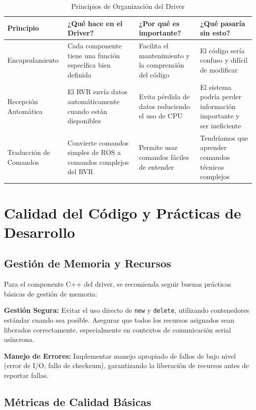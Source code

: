 \documentclass[11pt]{article}
\numberwithin{figure}{section}
\numberwithin{table}{section}
\begin{document}
\begin{table}[htbp]
\centering
\caption{Principios de Organización del Driver}
\label{tab:organizacion_driver}
\begin{tabular}{|p{}|p{}|p{}|p{}|}
\hline
\textbf{Principio} & \textbf{¿Qué hace en el Driver?} & \textbf{¿Por qué es importante?} & \textbf{¿Qué pasaría sin esto?} \\
\hline
Encapsulamiento & Cada componente tiene una función específica bien definida & Facilita el mantenimiento y la comprensión del código & El código sería confuso y difícil de modificar \\
\hline
Recepción Automática & El RVR envía datos automáticamente cuando están disponibles & Evita pérdida de datos reduciendo el uso de CPU & El sistema podría perder información importante y ser ineficiente \\
\hline
Traducción de Comandos & Convierte comandos simples de ROS a comandos complejos del RVR & Permite usar comandos fáciles de entender & Tendríamos que aprender comandos técnicos complejos \\
\hline
\end{tabular}
\end{table}


\newpage


\section{Calidad del Código y Prácticas de Desarrollo}


\subsection{Gestión de Memoria y Recursos}

Para el componente C++ del driver, se recomienda seguir buenas prácticas básicas de gestión de memoria:

\textbf{Gestión Segura:} Evitar el uso directo de \texttt{new} y \texttt{delete}, utilizando contenedores estándar cuando sea posible. Asegurar que todos los recursos asignados sean liberados correctamente, especialmente en contextos de comunicación serial asíncrona.

\textbf{Manejo de Errores:} Implementar manejo apropiado de fallos de bajo nivel (error de I/O, fallo de checksum), garantizando la liberación de recursos antes de reportar fallas.


\subsection{Métricas de Calidad Básicas}
\end{document}
